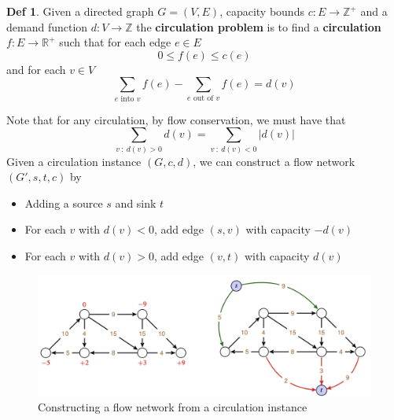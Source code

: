 \documentclass{article}
\theoremstyle{plain}
\theoremstyle{definition}
\newtheorem{defn}[dummy]{Def}
\begin{document}
        \begin{defn}
            Given a directed graph $G = (V, E)$, capacity bounds $c : E \to \mathbb{Z}^+$ and a demand function $d : V \to \mathbb{Z}$ the \textbf{circulation problem} is to find a \textbf{circulation} $f : E \to \mathbb{R}^+$ such that for each edge $e \in E$
            \[ 0 \leq f(e) \leq c(e) \tag{Capacity Constraint}\]
            and for each $v \in V$
            \[ \sum_{e \text{ into } v} f(e) - \sum_{e \text{ out of } v} f(e)= d(v) 
 \tag{Flow Conservation} \]
        \end{defn}
        \noindent Note that for any circulation, by flow conservation, we must have that 
        \[ \sum_{v \ : \ d(v) > 0} d(v) = \sum_{v \ : \ d(v) < 0} |d(v)|  \]
        Given a circulation instance $(G,c,d)$, we can construct a flow network $(G', s, t, c)$ by
        \begin{itemize}
            \item Adding a source $s$ and sink $t$
            \item For each $v$ with $d(v) < 0$, add edge $(s,v)$ with capacity $-d(v)$
            \item For each $v$ with $d(v) > 0$, add edge $(v,t)$ with capacity $d(v)$
        \end{itemize}

        \begin{figure}
            \centering
            \includegraphics[width=\linewidth]{images/circulation.png}
            \caption{Constructing a flow network from a circulation instance}
            \label{fig:circulation}
        \end{figure}
        
\end{document}
